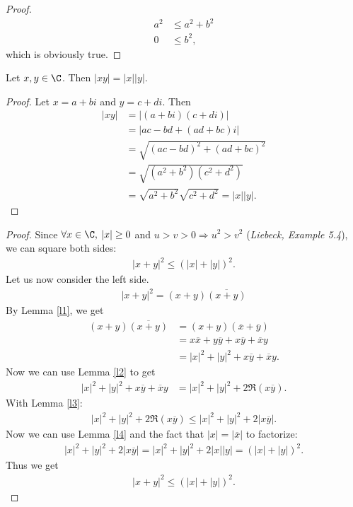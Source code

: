 \documentclass{article}
\begin{document}
\begin{adjustwidth}{2em}{0pt}
\begin{proof}
    \begin{align*}
      a^2 & \leq a^2+b^2 \\
      0   & \leq b^2,
    \end{align*}
    which is obviously true.
  \end{proof}
  \begin{lemma}
    \label{l4}
    Let $x,y\in\C$. Then $|xy|=|x||y|$.
  \end{lemma}
  \begin{proof}
    Let $x=a+bi$ and $y=c+di$. Then
    \begin{align*}
      |xy| & =|(a+bi)(c+di)|                       \\
           & =|ac-bd+(ad+bc)i|                     \\
           & =\sqrt{(ac-bd)^2+(ad+bc)^2}           \\
           & =\sqrt{(a^2+b^2)(c^2+d^2)}            \\
           & =\sqrt{a^2+b^2}\sqrt{c^2+d^2}=|x||y|.
    \end{align*}
  \end{proof}
\end{adjustwidth}
\begin{proof}
  Since $\forall x\in\C,\:|x|\geq0$ and $u>v>0\Rightarrow u^2>v^2$ (\emph{Liebeck, Example 5.4}), we can square both sides:
  \begin{align*}
    |x+y|^2\leq (|x|+|y|)^2.
  \end{align*}
  Let us now consider the left side.
  \begin{align*}
    |x+y|^2=(x+y)\overline{(x+y)}
  \end{align*}
  By Lemma \ref{l1}, we get
  \begin{align*}
    (x+y)\overline{(x+y)} & =(x+y)(\overline{x}+\overline{y})                \\
                      & =x\overline{x}+y\overline{y}+x\overline{y}+\overline{x}y \\
                      & =|x|^2+|y|^2+x\overline{y}+\overline{x}y.
  \end{align*}
  Now we can use Lemma \ref{l2} to get
  \begin{align*}
    |x|^2+|y|^2+x\overline{y}+\overline{x}y & =|x|^2+|y|^2+2\Re(x\overline{y}).
  \end{align*}
  With Lemma \ref{l3}:
  \begin{align*}
    |x|^2+|y|^2+2\Re(x\overline{y})\leq |x|^2+|y|^2+2|x\overline{y}|.
  \end{align*}
  Now we can use Lemma \ref{l4} and the fact that $|x|=|\overline{x}|$ to factorize:
  \begin{align*}
    |x|^2+|y|^2+2|x\overline{y}| = |x|^2+|y|^2+2|x||y| = (|x|+|y|)^2.
  \end{align*}
  Thus we get
  \begin{align*}
    |x+y|^2\leq (|x|+|y|)^2.
  \end{align*}
\end{proof}
\end{document}
